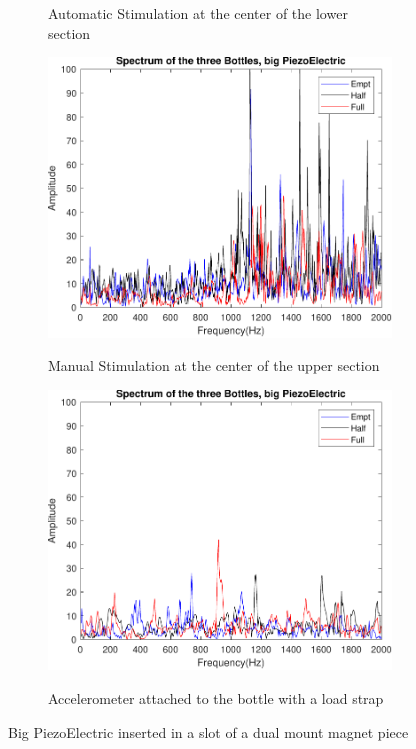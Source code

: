 \begin{figure}[]
\begin{subfigure}{0.45\textwidth}
        \caption{Automatic Stimulation at the center of the lower section}{}
        \label{subfig:ResPiezBAuBot}
    \end{subfigure}
    \begin{subfigure}{0.45\textwidth}
        \centering
        \includegraphics[width=\linewidth]{Chapters/6CHP/Figures/ResultsSensors/PiezBMaTop.pdf}
        \caption{Manual Stimulation at the center of the upper section}{}
        \label{subfig:ResPiezBMaTop}
    \end{subfigure}
    \begin{subfigure}{0.45\textwidth}
        \centering
        \includegraphics[width=\linewidth]{Chapters/6CHP/Figures/ResultsSensors/PiezBAuTop.pdf}
        \caption{Accelerometer attached to the bottle with a load strap}{}
        \label{subfig:ResPiezBAuTop}
    \end{subfigure}
    \caption{Big PiezoElectric inserted in a slot of a dual mount magnet piece}{}
    \label{fig:PiezB}
\end{figure}
